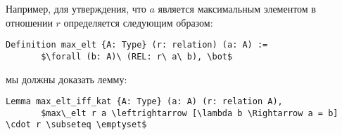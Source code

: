 \documentclass[times
              ]{itmo-student-thesis}
\begin{document}
   Например, для утверждения, что $a$ является максимальным элементом в отношении $r$ определяется следующим образом:
   \begin{lstlisting}[float=!h,caption={Определение max\_elt в hahn},label={lst1},mathescape=true]
     Definition max_elt {A: Type} (r: relation) (a: A) :=
       $\forall (b: A)\ (REL: r\ a\ b), \bot$
   \end{lstlisting}
   мы должны доказать лемму:
   \begin{lstlisting}[mathescape=truem]
     Lemma max_elt_iff_kat {A: Type} (a: A) (r: relation A),
       $max\_elt r a \leftrightarrow [\lambda b \Rightarrow a = b] \cdot r \subseteq \emptyset$
   \end{lstlisting}



\end{document}
